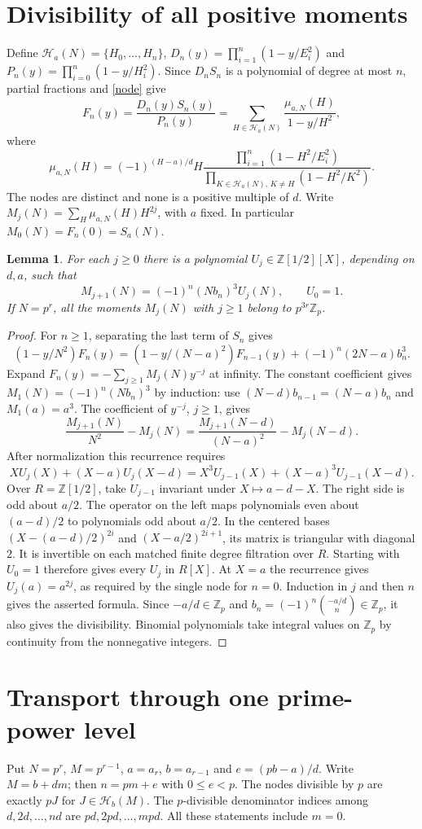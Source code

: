 \documentclass[11pt]{article}
\newtheorem{lemma}[theorem]{Lemma}
\newcommand{\Z}{\mathbb Z}
\newcommand{\HH}{\mathcal H}
\begin{document}
\newpage
\section{Divisibility of all positive moments}
Define $\HH_a(N)=\{H_0,\ldots,H_n\}$,
$D_n(y)=\prod_{i=1}^n(1-y/E_i^2)$ and
$P_n(y)=\prod_{i=0}^n(1-y/H_i^2)$. Since $D_n S_n$ is a polynomial
of degree at most $n$, partial fractions and \eqref{node} give
\[
 F_n(y)=\frac{D_n(y)S_n(y)}{P_n(y)}
       =\sum_{H\in\HH_a(N)}\frac{\mu_{a,N}(H)}{1-y/H^2},
\]
where
\[
 \mu_{a,N}(H)=(-1)^{(H-a)/d} H
 \frac{\prod_{i=1}^n(1-H^2/E_i^2)}
      {\prod_{K\in\HH_a(N),\,K\ne H}(1-H^2/K^2)} .
\]
The nodes are distinct and none is a positive multiple of $d$.
Write $M_j(N)=\sum_H\mu_{a,N}(H)H^{2j}$, with $a$ fixed.
In particular $M_0(N)=F_n(0)=S_a(N)$.
\begin{lemma}\label{moments}
For each $j\ge0$ there is a polynomial $U_j\in\Z[1/2][X]$,
depending on $d,a$, such that
\[
 M_{j+1}(N)=(-1)^n(Nb_n)^3U_j(N),\qquad U_0=1.
\]
If $N=p^r$, all the moments $M_j(N)$ with $j\ge1$ belong to
$p^{3r}\Z_p$.
\end{lemma}
\begin{proof}
For $n\ge1$, separating the last term of $S_n$ gives
\[
 (1-y/N^2)F_n(y)
 =(1-y/(N-a)^2)F_{n-1}(y)+(-1)^n(2N-a)b_n^3.
\]
Expand $F_n(y)=-\sum_{j\ge1}M_j(N)y^{-j}$ at infinity.
The constant coefficient gives $M_1(N)=(-1)^n(Nb_n)^3$ by induction:
use $(N-d)b_{n-1}=(N-a)b_n$ and $M_1(a)=a^3$.
The coefficient of $y^{-j}$, $j\ge1$, gives
\[
 \frac{M_{j+1}(N)}{N^2}-M_j(N)=
 \frac{M_{j+1}(N-d)}{(N-a)^2}-M_j(N-d).
\]
After normalization this recurrence requires
\[
 XU_j(X)+(X-a)U_j(X-d)
 =X^3U_{j-1}(X)+(X-a)^3U_{j-1}(X-d).
\]
Over $R=\Z[1/2]$, take $U_{j-1}$ invariant under $X\mapsto a-d-X$.
The right side is odd about $a/2$. The operator on the left maps
polynomials even about $(a-d)/2$ to polynomials odd about $a/2$.
In the centered bases $(X-(a-d)/2)^{2i}$ and $(X-a/2)^{2i+1}$,
its matrix is triangular with diagonal $2$. It is invertible on
each matched finite degree filtration over $R$. Starting with $U_0=1$
therefore gives every $U_j$ in $R[X]$. At $X=a$ the recurrence gives
$U_j(a)=a^{2j}$, as required by the single node for $n=0$.
Induction in $j$ and then $n$ gives the asserted formula.
Since $-a/d\in\Z_p$ and $b_n=(-1)^n\binom{-a/d}{n}\in\Z_p$, it also
gives the divisibility. Binomial polynomials take integral values on
$\Z_p$ by continuity from the nonnegative integers.
\end{proof}

\newpage
\section{Transport through one prime-power level}
Put $N=p^r$, $M=p^{r-1}$, $a=a_r$, $b=a_{r-1}$ and
$e=(pb-a)/d$. Write $M=b+dm$; then $n=pm+e$ with $0\le e<p$.
The nodes divisible by $p$ are exactly $pJ$ for $J\in\HH_b(M)$.
The $p$-divisible denominator indices among $d,2d,\ldots,nd$ are
$pd,2pd,\ldots,mpd$. All these statements include $m=0$.
\end{document}
